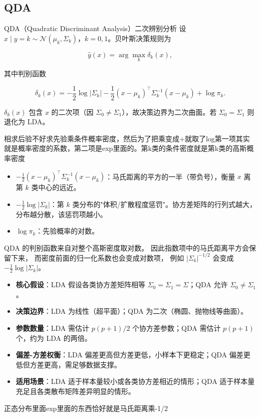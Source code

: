 \subsection{QDA}
\begin{definition}{QDA（Quadratic Discriminant Analysis）二次辨别分析}
设 $x\mid y=k\sim\mathcal{N}(\mu_k,\Sigma_k)$，$k=0,1$。贝叶斯决策规则为

\[
\hat{y}(x)=\arg\max_k \delta_k(x),
\]

其中判别函数

\[
\delta_k(x)=-\frac{1}{2}\log|\Sigma_k|-\frac{1}{2}(x-\mu_k)^\top\Sigma_k^{-1}(x-\mu_k)+\log\pi_k.
\]

$\delta_k(x)$ 包含 $x$ 的二次项（因 $\Sigma_0\neq\Sigma_1$），故决策边界为二次曲面。若 $\Sigma_0=\Sigma_1$ 则退化为 LDA。
\end{definition}
\begin{dxtips}
    相求后验不好求先验乘条件概率密度，然后为了把乘变成+就取了log第一项其实就是概率密度的系数，第二项是exp里面的。第k类的条件密度就是第k类的高斯概率密度
\end{dxtips}
\begin{itemize}
    \item $\displaystyle -\frac{1}{2}(x-\mu_k)^\top\Sigma_k^{-1}(x-\mu_k)$：马氏距离的平方的一半（带负号），衡量 $x$ 离第 $k$ 类中心的远近。
    \item $\displaystyle -\frac{1}{2}\log|\Sigma_k|$：第 $k$ 类分布的"体积/扩散程度惩罚"。协方差矩阵的行列式越大，分布越分散，该惩罚项越小。
    \item $\log\pi_k$：先验概率的对数。
\end{itemize}
\begin{dxtips}
    QDA 的判别函数来自对整个高斯密度取对数。
    因此指数项中的马氏距离平方会保留下来，
    而密度前面的归一化系数也会变成对数项，
    例如 $|\Sigma_k|^{-1/2}$ 会变成 $-\frac12\log|\Sigma_k|$。
\end{dxtips}
\begin{itemize}
    \item \textbf{核心假设}：LDA 假设各类协方差矩阵相等 $\Sigma_0=\Sigma_1=\Sigma$；QDA 允许 $\Sigma_0\neq\Sigma_1$。
    \item \textbf{决策边界}：LDA 为线性（超平面）；QDA 为二次（椭圆、抛物线等曲面）。
    \item \textbf{参数数量}：LDA 需估计 $p(p+1)/2$ 个协方差参数；QDA 需估计 $p(p+1)$ 个，约为 LDA 的两倍。
    \item \textbf{偏差-方差权衡}：LDA 偏差更高但方差更低，小样本下更稳定；QDA 偏差更低但方差更高，需足够数据支撑。
    \item \textbf{适用场景}：LDA 适于样本量较小或各类协方差相近的情形；QDA 适于样本量充足且各类散布矩阵差异明显的情形。
\end{itemize}
\begin{dxtips}
    正态分布里面exp里面的东西恰好就是马氏距离乘-1/2
\end{dxtips}

